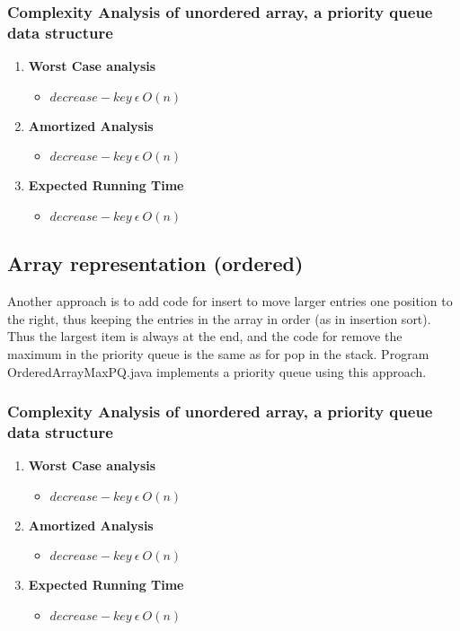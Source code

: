 \documentclass{article}
\begin{document}
\subsubsection{Complexity Analysis of unordered array, a priority queue data structure}
\begin{enumerate}
  \item \textbf{Worst Case analysis} \\
  \begin{itemize}
    \item $decrease-key ~\epsilon ~O(n)$
  \end{itemize}
  \item \textbf{Amortized Analysis}
  \begin{itemize}
    \item $decrease-key ~\epsilon ~O(n)$
  \end{itemize}
  \item \textbf{Expected Running Time}
  \begin{itemize}
    \item $decrease-key ~\epsilon ~O(n)$
  \end{itemize}

\end{enumerate}

  \subsection{Array representation (ordered)}
  Another approach is to add code for insert to move larger entries one position to the right, thus keeping the entries in the array in order (as in insertion sort). Thus the largest item is always at the end, and the code for remove the maximum in the priority queue is the same as for pop in the stack. Program OrderedArrayMaxPQ.java implements a priority queue using this approach.

  \subsubsection{Complexity Analysis of unordered array, a priority queue data structure}
  \begin{enumerate}
    \item \textbf{Worst Case analysis} \\
    \begin{itemize}
      \item $decrease-key ~\epsilon ~O(n)$
    \end{itemize}
    \item \textbf{Amortized Analysis}
    \begin{itemize}
      \item $decrease-key ~\epsilon ~O(n)$
    \end{itemize}
    \item \textbf{Expected Running Time}
    \begin{itemize}
      \item $decrease-key ~\epsilon ~O(n)$
    \end{itemize}

  \end{enumerate}
\end{document}
